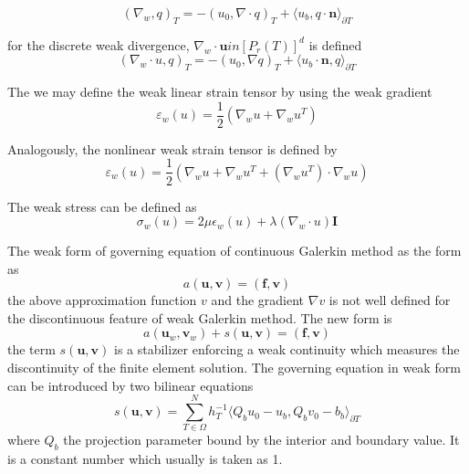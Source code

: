 \begin{equation}
(\nabla_{w}, q)_{T} = -(u_{0}, \nabla \cdot q)_{T} + \langle u_{b}, q \cdot \mathbf{n} \rangle_{\partial T}
\end{equation}

for the discrete weak divergence, $ \nabla_{w} \cdot \mathbf{u} in [P_{r} (T)]^{d} $ is defined 
\begin{equation}
(\nabla_w \cdot u, q)_{T} = -(u_{0}, \nabla q)_{T} + \langle u_{b} \cdot \mathbf{n}, q \rangle_{\partial T}
\end{equation}

The we may define the weak linear strain tensor by using the weak gradient
\begin{equation}
\varepsilon_{w} (u) = \frac{1}{2} (\nabla_{w} u + \nabla_{w} u^{T})
\end{equation}

Analogously, the nonlinear weak strain tensor is defined by 
\begin{equation}
\varepsilon_{w} (u) = \frac{1}{2} (\nabla_{w} u + \nabla_{w} u^{T} + (\nabla_w u^{T}) \cdot \nabla_w u ) 
\end{equation}

The weak stress can be defined as
\begin{equation}
\sigma_{w} (u) = 2 \mu \epsilon_{w}(u) + \lambda(\nabla_{w} \cdot u) \mathbf{I}
\end{equation}

The weak form of governing equation of continuous Galerkin method as the form as 
\begin{equation}
a(\mathbf{u}, \mathbf{v}) = (\mathbf{f}, \mathbf{v})
\end{equation}
the above approximation function $ v $ and the gradient $ \nabla v $ is not well defined for the discontinuous feature of weak Galerkin method. The new form is 
\begin{equation}
a(\mathbf{u}_{w}, \mathbf{v}_{w}) + s(\mathbf{u}, \mathbf{v}) = (\mathbf{f}, \mathbf{v})
\end{equation}
the term $ s(\mathbf{u}, \mathbf{v}) $ is a stabilizer enforcing a weak continuity which measures the discontinuity of the finite element solution. The governing equation in weak form can be introduced by two bilinear equations
\begin{equation}
s(\mathbf{u}, \mathbf{v}) = \sum_{T\in \Omega}^{N} h_{T}^{-1} \langle Q_{b} u_{0} - u_{b}, Q_{b} v_{0} - b_{b} \rangle_{\partial T}
\end{equation}
where $ Q_{b} $ the projection parameter bound by the interior and boundary value. It is a constant number which usually is taken as 1.

